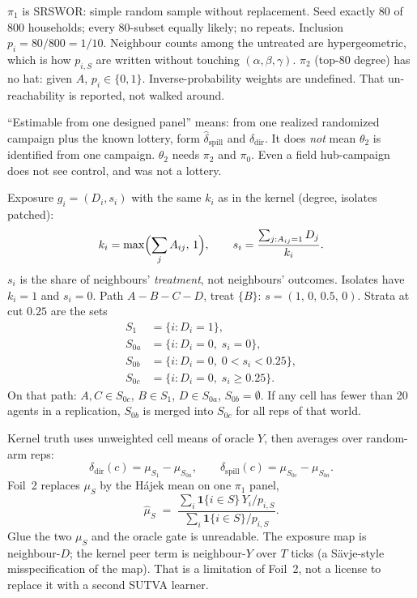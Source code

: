 \documentclass[11pt]{article}
\begin{document}
$\pi_1$ is SRSWOR: simple random sample without replacement. Seed
exactly 80 of 800 households; every 80-subset equally likely; no
repeats. Inclusion $p_i=80/800=1/10$. Neighbour counts among the
untreated are hypergeometric, which is how $p_{i,S}$ are written
without touching $(\alpha,\beta,\gamma)$. $\pi_2$ (top-80 degree) has
no hat: given $A$, $p_i\in\{0,1\}$. Inverse-probability weights are
undefined. That un-reachability is reported, not walked around.

``Estimable from one designed panel'' means: from one realized
randomized campaign plus the known lottery, form
$\widehat\delta_{\mathrm{spill}}$ and $\widehat\delta_{\mathrm{dir}}$.
It does \emph{not} mean $\theta_2$ is identified from one campaign.
$\theta_2$ needs $\pi_2$ and $\pi_0$. Even a field hub-campaign does
not see control, and was not a lottery.

Exposure $g_i=(D_i,s_i)$ with the same $k_i$ as in the kernel
(degree, isolates patched):
\begin{equation}
  k_i=\max\Bigl(\sum_j A_{ij},\,1\Bigr),\qquad
  s_i=\frac{\sum_{j:A_{ij}=1}D_j}{k_i}.
\end{equation}
$s_i$ is the share of neighbours' \emph{treatment}, not neighbours'
outcomes. Isolates have $k_i=1$ and $s_i=0$. Path $A{-}B{-}C{-}D$,
treat $\{B\}$: $s=(1,\,0,\,0.5,\,0)$. Strata at cut $0.25$ are the
sets
\begin{align*}
  S_1  &= \{i:D_i=1\}, \\
  S_{0a} &= \{i:D_i=0,\; s_i=0\}, \\
  S_{0b} &= \{i:D_i=0,\; 0<s_i<0.25\}, \\
  S_{0c} &= \{i:D_i=0,\; s_i\ge 0.25\}.
\end{align*}
On that path: $A,C\in S_{0c}$, $B\in S_1$, $D\in S_{0a}$, $S_{0b}=\emptyset$.
If any cell has fewer than 20 agents in a replication, $S_{0b}$ is
merged into $S_{0c}$ for all reps of that world.

Kernel truth uses unweighted cell means of oracle $Y$, then averages
over random-arm reps:
\begin{equation}
  \delta_{\mathrm{dir}}(c)=\mu_{S_1}-\mu_{S_{0a}},\qquad
  \delta_{\mathrm{spill}}(c)=\mu_{S_{0c}}-\mu_{S_{0a}}.
\end{equation}
Foil~2 replaces $\mu_S$ by the H\'ajek mean on one $\pi_1$ panel,
\begin{equation}
  \widehat\mu_S
  \;=\;
  \frac{\sum_i \mathbf{1}\{i\in S\}\,Y_i/p_{i,S}}
       {\sum_i \mathbf{1}\{i\in S\}/p_{i,S}}.
\end{equation}
Glue the two $\mu_S$ and the oracle gate is unreadable. The exposure
map is neighbour-$D$; the kernel peer term is neighbour-$Y$ over $T$
ticks (a S\"avje-style misspecification of the map). That is a
limitation of Foil~2, not a license to replace it with a second SUTVA
learner.
\end{document}
